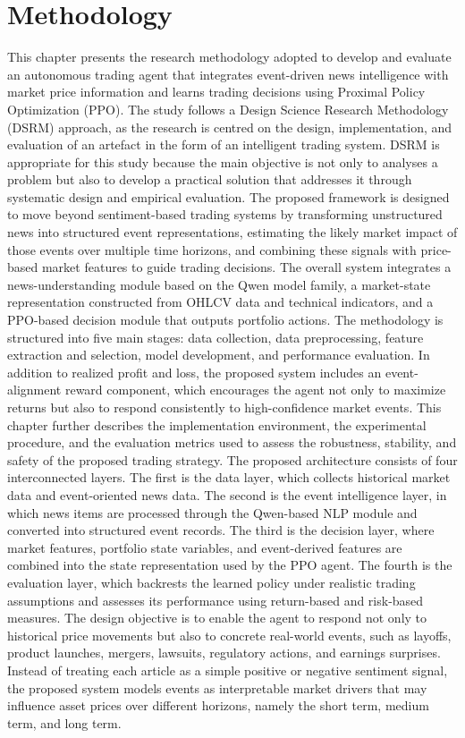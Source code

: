 \documentclass[a4paper,fleqn]{cas-sc}
\begin{document}
\section{Methodology}\label{sec:methodology}
This chapter presents the research methodology adopted to develop and evaluate an autonomous trading agent that integrates event-driven news intelligence with market price information and learns trading decisions using Proximal Policy Optimization (PPO). The study follows a Design Science Research Methodology (DSRM) approach, as the research is centred on the design, implementation, and evaluation of an artefact in the form of an intelligent trading system. DSRM is appropriate for this study because the main objective is not only to analyses a problem but also to develop a practical solution that addresses it through systematic design and empirical evaluation. 
The proposed framework is designed to move beyond sentiment-based trading systems by transforming unstructured news into structured event representations, estimating the likely market impact of those events over multiple time horizons, and combining these signals with price-based market features to guide trading decisions. The overall system integrates a news-understanding module based on the Qwen model family, a market-state representation constructed from OHLCV data and technical indicators, and a PPO-based decision module that outputs portfolio actions. 
The methodology is structured into five main stages: data collection, data preprocessing, feature extraction and selection, model development, and performance evaluation. In addition to realized profit and loss, the proposed system includes an event-alignment reward component, which encourages the agent not only to maximize returns but also to respond consistently to high-confidence market events. This chapter further describes the implementation environment, the experimental procedure, and the evaluation metrics used to assess the robustness, stability, and safety of the proposed trading strategy. 
The proposed architecture consists of four interconnected layers. The first is the data layer, which collects historical market data and event-oriented news data. The second is the event intelligence layer, in which news items are processed through the Qwen-based NLP module and converted into structured event records. The third is the decision layer, where market features, portfolio state variables, and event-derived features are combined into the state representation used by the PPO agent. The fourth is the evaluation layer, which backrests the learned policy under realistic trading assumptions and assesses its performance using return-based and risk-based measures. 
The design objective is to enable the agent to respond not only to historical price movements but also to concrete real-world events, such as layoffs, product launches, mergers, lawsuits, regulatory actions, and earnings surprises. Instead of treating each article as a simple positive or negative sentiment signal, the proposed system models events as interpretable market drivers that may influence asset prices over different horizons, namely the short term, medium term, and long term.
\end{document}
